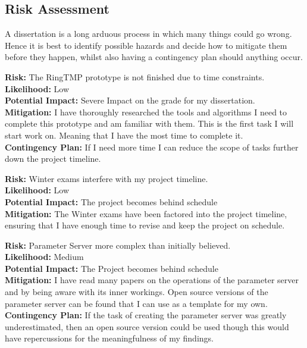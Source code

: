 \subsection{Risk Assessment}

A dissertation is a long arduous process in which many things could go wrong.
Hence it is best to identify possible hazards and decide how to mitigate them
before they happen, whilst also having a contingency plan should anything occur. \par

\noindent \textbf{Risk:} The RingTMP prototype is not finished due to time constraints.\\
\textbf{Likelihood:} Low\\
\textbf{Potential Impact:} Severe Impact on the grade for my dissertation.\\
\textbf{Mitigation:} I have thoroughly researched the tools and algorithms I need to
complete this prototype and am familiar with them. This is the first task I will
start work on. Meaning that I have the most time to complete it.\\
\textbf{Contingency Plan:} If I need more time I can reduce the scope of tasks further
down the project timeline. \par

\noindent \textbf{Risk:} Winter exams interfere with my project timeline.\\
\textbf{Likelihood:} Low\\
\textbf{Potential Impact:} The project becomes behind schedule\\
\textbf{Mitigation:} The Winter exams have been factored into the project timeline,
ensuring that I have enough time to revise and keep the project on schedule.\par

\noindent \textbf{Risk:} Parameter Server more complex than initially believed.\\
\textbf{Likelihood:} Medium\\
\textbf{Potential Impact:} The Project becomes behind schedule\\
\textbf{Mitigation:} I have read many papers on the operations of the parameter server
and by being aware with its inner workings. Open source versions of the
parameter server can be found that I can use as a template for my own.\\
\textbf{Contingency Plan:} If the task of creating the parameter server was greatly
underestimated, then an open source version could be used though this would have
repercussions for the meaningfulness of my findings.\par

